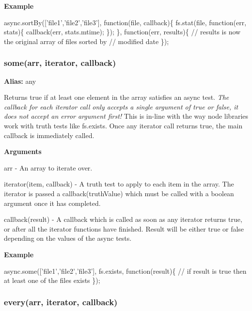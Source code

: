 {\bfseries Example}


\begin{DoxyCode}
async.sortBy(['file1','file2','file3'], function(file, callback)\{
    fs.stat(file, function(err, stats)\{
        callback(err, stats.mtime);
    \});
\}, function(err, results)\{
    // results is now the original array of files sorted by
    // modified date
\});
\end{DoxyCode}
 



\label{_some}%
 \subsubsection*{some(arr, iterator, callback)}

{\bfseries Alias\+:} any

Returns true if at least one element in the array satisfies an async test. {\itshape The callback for each iterator call only accepts a single argument of true or false, it does not accept an error argument first!} This is in-\/line with the way node libraries work with truth tests like fs.\+exists. Once any iterator call returns true, the main callback is immediately called.

{\bfseries Arguments}


\begin{DoxyItemize}
\item arr -\/ An array to iterate over.
\item iterator(item, callback) -\/ A truth test to apply to each item in the array. The iterator is passed a callback(truth\+Value) which must be called with a boolean argument once it has completed.
\item callback(result) -\/ A callback which is called as soon as any iterator returns true, or after all the iterator functions have finished. Result will be either true or false depending on the values of the async tests.
\end{DoxyItemize}

{\bfseries Example}


\begin{DoxyCode}
async.some(['file1','file2','file3'], fs.exists, function(result)\{
    // if result is true then at least one of the files exists
\});
\end{DoxyCode}
 



\label{_every}%
 \subsubsection*{every(arr, iterator, callback)}


